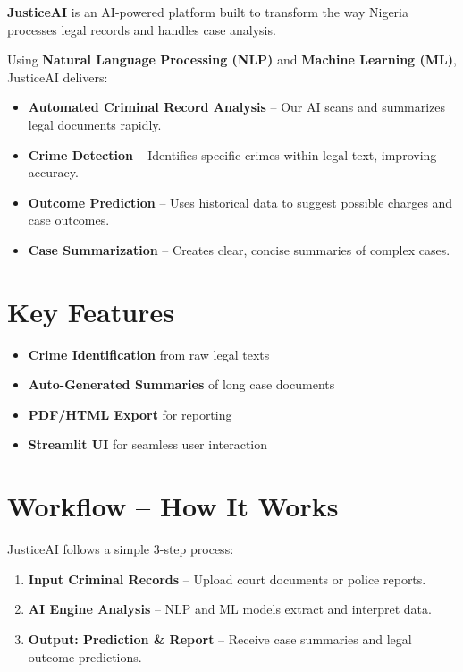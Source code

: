 \documentclass[12pt]{article}
\begin{document}
\textbf{JusticeAI} is an AI-powered platform built to transform the way Nigeria processes legal records and handles case analysis.

Using \textbf{Natural Language Processing (NLP)} and \textbf{Machine Learning (ML)}, JusticeAI delivers:

\begin{itemize}
    \item \textbf{Automated Criminal Record Analysis} – Our AI scans and summarizes legal documents rapidly.
    \item \textbf{Crime Detection} – Identifies specific crimes within legal text, improving accuracy.
    \item \textbf{Outcome Prediction} – Uses historical data to suggest possible charges and case outcomes.
    \item \textbf{Case Summarization} – Creates clear, concise summaries of complex cases.
\end{itemize}

\section*{Key Features}

\begin{itemize}
    \item \textbf{Crime Identification} from raw legal texts
    \item \textbf{Auto-Generated Summaries} of long case documents
    \item \textbf{PDF/HTML Export} for reporting
    \item \textbf{Streamlit UI} for seamless user interaction
\end{itemize}

\section*{Workflow – How It Works}

JusticeAI follows a simple 3-step process:

\begin{enumerate}
    \item \textbf{Input Criminal Records} – Upload court documents or police reports.
    \item \textbf{AI Engine Analysis} – NLP and ML models extract and interpret data.
    \item \textbf{Output: Prediction \& Report} – Receive case summaries and legal outcome predictions.
\end{enumerate}
\end{document}
